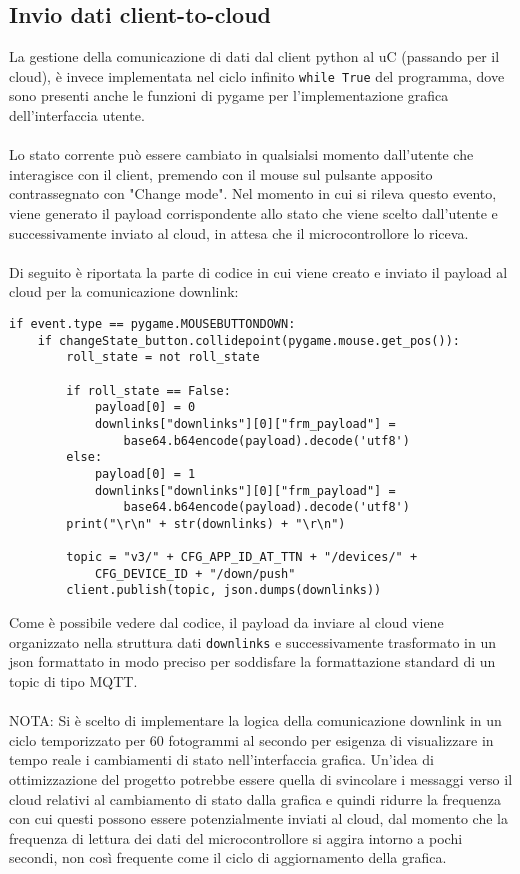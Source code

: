 \subsection{Invio dati client-to-cloud}
La gestione della comunicazione di dati dal client python al uC (passando per il cloud), è invece implementata nel ciclo infinito \Verb|while True| 
del programma, dove sono presenti anche le funzioni di pygame per l'implementazione grafica dell'interfaccia utente.
\\\\Lo stato corrente può essere cambiato in qualsialsi momento dall'utente che interagisce con il client, premendo con il mouse sul pulsante
apposito contrassegnato con "Change mode". Nel momento in cui si rileva questo evento, viene generato il payload corrispondente allo stato che viene 
scelto dall'utente e successivamente inviato al cloud, in attesa che il microcontrollore lo riceva.
\\\\Di seguito è riportata la parte di codice in cui viene creato e inviato il payload al cloud per la comunicazione downlink:
\begin{verbatim}
if event.type == pygame.MOUSEBUTTONDOWN:
    if changeState_button.collidepoint(pygame.mouse.get_pos()):
        roll_state = not roll_state

        if roll_state == False:
            payload[0] = 0
            downlinks["downlinks"][0]["frm_payload"] = 
                base64.b64encode(payload).decode('utf8')
        else:
            payload[0] = 1
            downlinks["downlinks"][0]["frm_payload"] = 
                base64.b64encode(payload).decode('utf8')
        print("\r\n" + str(downlinks) + "\r\n")

        topic = "v3/" + CFG_APP_ID_AT_TTN + "/devices/" + 
            CFG_DEVICE_ID + "/down/push"
        client.publish(topic, json.dumps(downlinks))
\end{verbatim}
Come è possibile vedere dal codice, il payload da inviare al cloud viene organizzato nella struttura dati \Verb|downlinks| e successivamente trasformato in un json
formattato in modo preciso per soddisfare la formattazione standard di un topic di tipo MQTT.\\\\
NOTA: Si è scelto di implementare la logica della comunicazione downlink in un ciclo temporizzato per 60 fotogrammi al secondo per esigenza di 
visualizzare in tempo reale i cambiamenti di stato nell'interfaccia grafica. Un'idea di ottimizzazione del progetto potrebbe essere
quella di svincolare i messaggi verso il cloud relativi al cambiamento di stato dalla grafica e quindi ridurre la frequenza con cui questi possono essere potenzialmente
inviati al cloud, dal momento che la frequenza di lettura dei dati del microcontrollore si aggira intorno a pochi secondi, non così frequente come il ciclo di aggiornamento della grafica.


